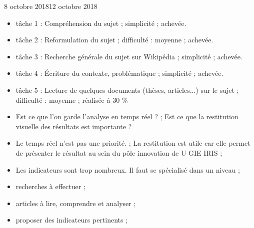 \documentclass[12pt]{fiche-rd-info}
\begin{document}

\begin{fichesuivi}{8 octobre 2018}{12 octobre 2018}

	\begin{travaileffectue}
		\begin{itemize}
			\item tâche 1 : Compréhension du sujet ; simplicité ; achevée.
			\item tâche 2 : Reformulation du sujet ; difficulté : moyenne ; achevée.
			\item tâche 3 : Recherche générale du sujet sur Wikipédia ; simplicité ; achevée.
			\item tâche 4 : \'Ecriture du contexte, problématique ; simplicité ; achevée.
			\item tâche 5 : Lecture de quelques documents (thèses, articles...) sur le sujet ; difficulté : moyenne ; réalisée à  $30$ \%
		\end{itemize}
	\end{travaileffectue}


	\begin{echange}
		\begin{itemize}
			\item Est ce que l’on garde l’analyse en temps réel ? ; Est ce que la restitution visuelle des résultats est
importante ?
			\item Le temps réel n’est pas une priorité. ; La restitution est utile car elle permet de présenter le résultat
au sein du pôle innovation de U GIE IRIS ;
			\item Les indicateurs sont trop nombreux. Il faut se spécialisé dans un niveau ;
		\end{itemize}
	\end{echange}

	\begin{planification}
		\begin{itemize}
			\item recherches à effectuer ;
			\item articles à lire, comprendre et analyser ;
			\item proposer des indicateurs pertinents ;
		\end{itemize}
	\end{planification}
\end{fichesuivi}
\end{document}
